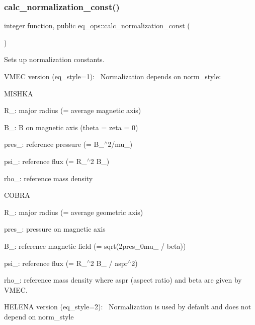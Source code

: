 \subsubsection{\texorpdfstring{calc\+\_\+normalization\+\_\+const()}{calc\_normalization\_const()}}
{\footnotesize\ttfamily integer function, public eq\+\_\+ops\+::calc\+\_\+normalization\+\_\+const (\begin{DoxyParamCaption}{ }\end{DoxyParamCaption})}



Sets up normalization constants. 


\begin{DoxyItemize}
\item V\+M\+EC version ({\ttfamily eq\+\_\+style=1})\+:~\newline
 Normalization depends on {\ttfamily norm\+\_\+style\+:} 
\begin{DoxyEnumerate}
\item M\+I\+S\+H\+KA
\begin{DoxyItemize}
\item R\+\_\+: major radius (= average magnetic axis)
\item B\+\_\+: B on magnetic axis (theta = zeta = 0)
\item pres\+\_\+: reference pressure (= B\+\_$^\wedge$2/mu\+\_)
\item psi\+\_\+: reference flux (= R\+\_$^\wedge$2 B\+\_)
\item rho\+\_\+: reference mass density
\end{DoxyItemize}
\item C\+O\+B\+RA
\begin{DoxyItemize}
\item R\+\_\+: major radius (= average geometric axis)
\item pres\+\_\+: pressure on magnetic axis
\item B\+\_\+: reference magnetic field (= sqrt(2pres\+\_\+0mu\+\_ / beta))
\item psi\+\_\+: reference flux (= R\+\_$^\wedge$2 B\+\_ / aspr$^\wedge$2)
\item rho\+\_\+: reference mass density where aspr (aspect ratio) and beta are given by V\+M\+EC.
\end{DoxyItemize}
\end{DoxyEnumerate}
\item H\+E\+L\+E\+NA version ({\ttfamily eq\+\_\+style=2})\+:~\newline
 Normalization is used by default and does not depend on {\ttfamily norm\+\_\+style} 
\end{DoxyItemize}


